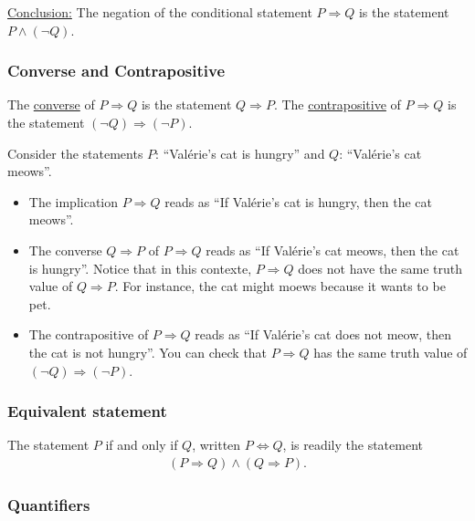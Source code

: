 	\underline{Conclusion:} The negation of the conditional statement $P \Rightarrow Q$ is the statement $P \wedge (\neg Q)$.

\subsubsection*{Converse and Contrapositive}

\begin{definition}
The \underline{converse} of $P \Rightarrow Q$ is the statement $Q \Rightarrow P$. The \underline{contrapositive} of $P \Rightarrow Q$ is the statement $(\neg Q) \Rightarrow (\neg P)$.
\end{definition}

\begin{example}
Consider the statements $P$: ``Valérie's cat is hungry'' and $Q$: ``Valérie's cat meows''. 
	\begin{itemize}
	\item The implication $P \Rightarrow Q$ reads as ``If Valérie's cat is hungry, then the cat meows''. 
	\item The converse $Q \Rightarrow P$ of $P \Rightarrow Q$ reads as ``If Valérie's cat meows, then the cat is hungry''. Notice that in this contexte, $P \Rightarrow Q$ does not have the same truth value of $Q \Rightarrow P$. For instance, the cat might moews because it wants to be pet. 
	\item The contrapositive of $P \Rightarrow Q$ reads as ``If Valérie's cat does not meow, then the cat is not hungry''. You can check that $P \Rightarrow Q$ has the same truth value of $(\neg Q) \Rightarrow (\neg P)$.
	\end{itemize}
\end{example}

\subsubsection*{Equivalent statement}

\begin{definition}
The statement $P$ if and only if $Q$, written $P \iff Q$, is readily the statement
	\begin{align*}
	(P \Rightarrow Q) \wedge (Q \Rightarrow P) .
	\end{align*}
\end{definition}

\subsubsection*{Quantifiers}

